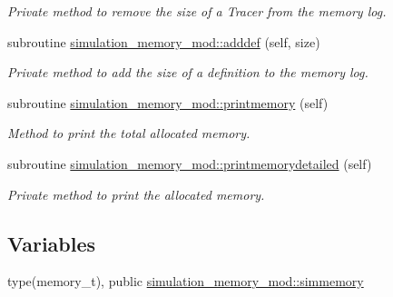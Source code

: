 \begin{DoxyCompactItemize}
\begin{DoxyCompactList}\small\item\em Private method to remove the size of a Tracer from the memory log. \end{DoxyCompactList}\item 
subroutine \hyperlink{namespacesimulation__memory__mod_ac6d6853bc462947d24a8f6234d625138}{simulation\+\_\+memory\+\_\+mod\+::adddef} (self, size)
\begin{DoxyCompactList}\small\item\em Private method to add the size of a definition to the memory log. \end{DoxyCompactList}\item 
subroutine \hyperlink{namespacesimulation__memory__mod_a16a7a1c7e88fe5a5523d23f83f0e04a0}{simulation\+\_\+memory\+\_\+mod\+::printmemory} (self)
\begin{DoxyCompactList}\small\item\em Method to print the total allocated memory. \end{DoxyCompactList}\item 
subroutine \hyperlink{namespacesimulation__memory__mod_a894bd4ec7462fd634d328ee5be4c6483}{simulation\+\_\+memory\+\_\+mod\+::printmemorydetailed} (self)
\begin{DoxyCompactList}\small\item\em Private method to print the allocated memory. \end{DoxyCompactList}\end{DoxyCompactItemize}
\subsection*{Variables}
\begin{DoxyCompactItemize}
\item 
type(memory\+\_\+t), public \hyperlink{namespacesimulation__memory__mod_af3e2714796469b4b1ec247569b184088}{simulation\+\_\+memory\+\_\+mod\+::simmemory}
\end{DoxyCompactItemize}
